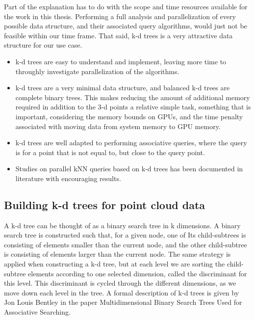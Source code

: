 Part of the explanation has to do with the scope and time resources available for the work in this thesis. Performing a full analysis and parallelization of every possible data structure, and their associated query algorithms, would just not be feasible within our time frame. That said, k-d trees is a very attractive data structure for our use case.

\begin{itemize}
    \item k-d trees are easy to understand and implement, leaving more time to throughly investigate parallelization of the algorithms.
    \item k-d trees are a very minimal data structure, and balanced k-d trees are complete binary trees. This makes reducing the amount of additional memory required in addition to the 3-d points a relative simple task, something that is important, considering the memory bounds on GPUs, and the time penalty associated with moving data from system memory to GPU memory.
    \item k-d trees are well adapted to performing associative queries, where the query is for a point that is not equal to, but close to the query point.
    \item Studies on parallel kNN queries based on k-d trees has been documented in literature with encouraging results\cite{Owens:2007:ASO}. %
\end{itemize}



\subsection{Building k-d trees for point cloud data} %
\label{ssub:building_k_d_trees_for_point_cloud_data}

A k-d tree can be thought of as a binary search tree in k dimensions. A binary search tree is constructed such that, for a given node, one of Its child-subtrees is consisting of elements smaller than the current node, and the other child-subtree is consisting of elements larger than the current node. The same strategy is applied when constructing a k-d tree, but at each level we are sorting the child-subtree elements according to one selected dimension, called the discriminant for this level. This discriminant is cycled through the different dimensions, as we move down each level in the tree. A formal description of k-d trees is given by Jon Louis Bentley in the paper Multidimensional Binary Search Trees Used for Associative Searching\cite{Bentley:1975:MBS:361002.361007}.

